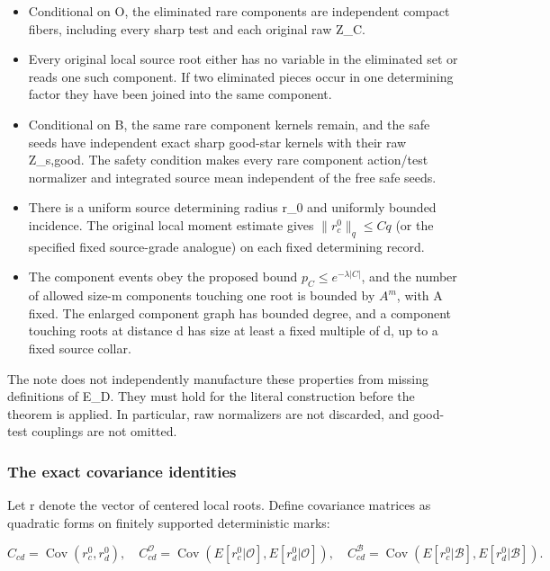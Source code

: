 \documentclass[
  11pt,
]{article}
\providecommand{\tightlist}{%
  \setlength{\itemsep}{0pt}\setlength{\parskip}{0pt}}
\begin{document}
\begin{itemize}
\tightlist
\item
  Conditional on O, the eliminated rare components are independent
  compact fibers, including every sharp test and each original raw Z\_C.
\item
  Every original local source root either has no variable in the
  eliminated set or reads one such component. If two eliminated pieces
  occur in one determining factor they have been joined into the same
  component.
\item
  Conditional on B, the same rare component kernels remain, and the safe
  seeds have independent exact sharp good-star kernels with their raw
  Z\_s,good. The safety condition makes every rare component action/test
  normalizer and integrated source mean independent of the free safe
  seeds.
\item
  There is a uniform source determining radius r\_0 and uniformly
  bounded incidence. The original local moment estimate gives
  \(\|r_c^0\|_q\le Cq\) (or the specified fixed source-grade analogue)
  on each fixed determining record.
\item
  The component events obey the proposed bound
  \(p_C\le e^{-\lambda |C|}\), and the number of allowed size-m
  components touching one root is bounded by \(A^m\), with A fixed. The
  enlarged component graph has bounded degree, and a component touching
  roots at distance d has size at least a fixed multiple of d, up to a
  fixed source collar.
\end{itemize}

The note does not independently manufacture these properties from
missing definitions of E\_D. They must hold for the literal construction
before the theorem is applied. In particular, raw normalizers are not
discarded, and good-test couplings are not omitted.

\hypertarget{the-exact-covariance-identities}{%
\subsubsection{The exact covariance
identities}\label{the-exact-covariance-identities}}

Let r denote the vector of centered local roots. Define covariance
matrices as quadratic forms on finitely supported deterministic marks:

\[
 C_{cd}=\operatorname{Cov}(r_c^0,r_d^0),\quad
 C^{\mathcal O}_{cd}=\operatorname{Cov}(E[r_c^0|\mathcal O],E[r_d^0|\mathcal O]),\quad
 C^{\mathcal B}_{cd}=\operatorname{Cov}(E[r_c^0|\mathcal B],E[r_d^0|\mathcal B]).
\]
\end{document}
